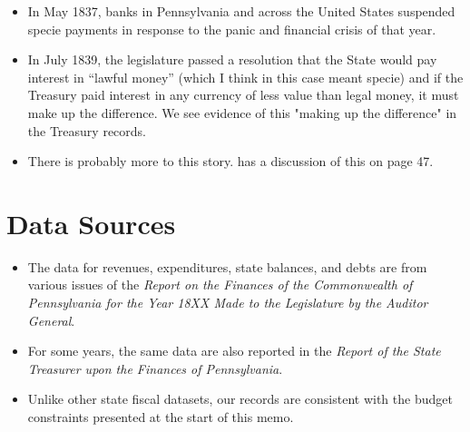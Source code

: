 \documentclass[11pt]{article}
\begin{document}
\begin{itemize}

\item In May 1837, banks in Pennsylvania and across the United States 
suspended specie payments  in response to the panic and financial 
crisis of that year.

\item In July 1839, the legislature passed a resolution that the State would 
pay interest in ``lawful money'' (which I think in this case meant specie) 
and if the Treasury paid interest in any currency of less value than legal 
money, it must make up the difference.  We see evidence of this "making up 
the difference" in the Treasury records.

\item There is probably more to this story.  \cite{worthington_1887} has a 
discussion of this on page 47.

\end{itemize}

\newpage

\section{Data Sources}

\begin{itemize}

\item The data for revenues, expenditures, state balances, and debts are 
from various issues of the {\em Report on the Finances of the Commonwealth of 
Pennsylvania for the Year 18XX Made to the Legislature by the Auditor General}.

\item For some years, the same data are also reported in the {\em Report of the State Treasurer upon the Finances of Pennsylvania}.

\item Unlike other state fiscal datasets, our records are consistent with the budget constraints presented at the start of this memo.

\end{itemize}


\clearpage

\end{document}
